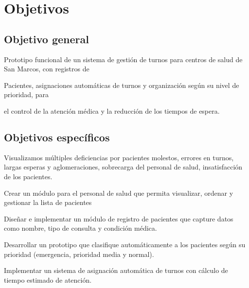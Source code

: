 \section{Objetivos}

\subsection{Objetivo general}

Prototipo funcional de un sistema de gestión de turnos para centros de salud de San Marcos, con registros de

Pacientes, asignaciones automáticas de turnos y organización según su nivel de prioridad, para

el control de la atención médica y la reducción de los tiempos de espera.

\subsection{Objetivos específicos}

Visualizamos múltiples deficiencias por pacientes molestos, errores en turnos, largas esperas y aglomeraciones, sobrecarga del personal de salud, insatisfacción de los pacientes.

Crear un módulo para el personal de salud que permita visualizar, ordenar y gestionar la lista de pacientes

Diseñar e implementar un módulo de registro de pacientes que capture datos como nombre, tipo de consulta y condición médica.

Desarrollar un prototipo que clasifique automáticamente a los pacientes según su prioridad (emergencia, prioridad media y normal).

Implementar un sistema de asignación automática de turnos con cálculo de tiempo estimado de atención.
